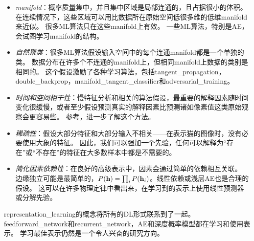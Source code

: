 \begin{itemize}
	\item \emph{\gls{manifold}}：概率质量集中，并且集中区域是局部连通的，且占据很小的体积。
	在连续情况下，这些区域可以用比数据所在原始空间低很多维的低维\gls{manifold}来近似。
	很多\gls{ML}算法只在这些\gls{manifold}上有效\citep{Goodfellow-2015-adversarial}。
	一些\gls{ML}算法，特别是\gls{AE}，会试图学习\gls{manifold}的结构。


	\item \emph{自然聚类}：很多\gls{ML}算法假设输入空间中的每个连通\gls{manifold}都是一个单独的类。
	数据分布在许多个不连通的\gls{manifold}上，但相同\gls{manifold}上数据的类别是相同的。
	这个假设激励了各种学习算法，包括\gls{tangent_propagation}，\gls{double_backprop}，\gls{manifold_tangent_classifier}和\gls{adversarial_training}。


	\item \emph{时间和空间相干性}：慢特征分析和相关的算法假设，最重要的解释因素随时间变化很缓慢，或者至少假设预测真实的解释因素比预测诸如像素值这类原始观察会更容易些。
	参考，进一步了解这个方法。


	\item \emph{稀疏性}：假设大部分特征和大部分输入不相关——在表示猫的图像时，没有必要使用大象的特征。
	因此，我们可以强加一个先验，任何可以解释为``存在''或``不存在''的特征在大多数样本中都是不需要的。


	\item \emph{简化因素依赖性}：在良好的高级表示中，因素会通过简单的依赖相互关联。
	边缘独立可能是最简单的，$P(\mathbf{h}) = \prod_i P(\mathbf{h}_i)$。线性依赖或浅层\gls{AE}也是合理的假设。
	这可以在许多物理定律中看出来，在学习到的表示上使用线性预测器或分解先验。
\end{itemize}


\gls{representation_learning}的概念将所有的\gls{DL}形式联系到了一起。
\gls{feedforward_network}和\gls{recurrent_network}，\gls{AE}和深度概率模型都在学习和使用表示。
学习最佳表示仍然是一个令人兴奋的研究方向。

